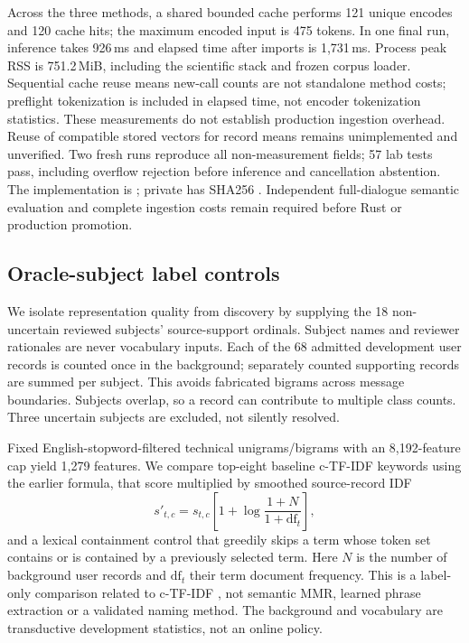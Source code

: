 \documentclass[11pt]{article}
\begin{document}
Across the three methods, a shared bounded cache performs 121 unique encodes and
120 cache hits; the maximum encoded input is 475 tokens. In one final run,
inference takes 926\,ms and elapsed time after imports is 1,731\,ms. Process peak
RSS is 751.2\,MiB, including the scientific stack and frozen corpus loader.
Sequential cache reuse means new-call counts are not standalone method costs;
preflight tokenization is included in elapsed time, not encoder tokenization
statistics. These measurements do not establish production ingestion overhead.
Reuse of compatible stored vectors for record means remains unimplemented and
unverified. Two fresh runs reproduce all non-measurement fields; 57 lab tests
pass, including overflow rejection before inference and cancellation abstention.
The implementation is ; private
 has SHA256
.
Independent full-dialogue semantic evaluation and complete ingestion costs remain
required before Rust or production promotion.

\subsection{Oracle-subject label controls}
We isolate representation quality from discovery by supplying the 18
non-uncertain reviewed subjects' source-support ordinals. Subject names and
reviewer rationales are never vocabulary inputs. Each of the 68 admitted
development user records is counted once in the background; separately counted
supporting records are summed per subject. This avoids fabricated bigrams across
message boundaries. Subjects overlap, so a record can contribute to multiple
class counts. Three uncertain subjects are excluded, not silently resolved.

Fixed English-stopword-filtered technical unigrams/bigrams with an 8,192-feature
cap yield 1,279 features. We compare top-eight baseline c-TF-IDF keywords using
the earlier formula, that score multiplied by smoothed source-record IDF
\begin{equation}
 s'_{t,c}=s_{t,c}\left[1+\log\frac{1+N}{1+\mathrm{df}_t}\right],
\end{equation}
and a lexical containment control that greedily skips a term whose token set
contains or is contained by a previously selected term. Here $N$ is the number
of background user records and $\mathrm{df}_t$ their term document frequency.
This is a label-only comparison related to c-TF-IDF \cite{bertopic}, not semantic
MMR, learned phrase extraction or a validated naming method. The background and
vocabulary are transductive development statistics, not an online policy.
\end{document}
